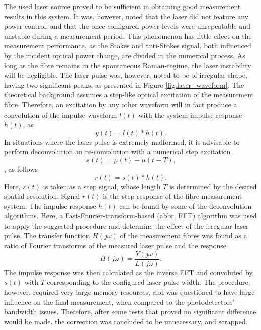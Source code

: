 \documentclass{standalone}
\begin{document}
The used laser source proved to be sufficient in obtaining good measurement results in this system. It was, however, noted that the laser did not feature any power control, and that the once configured power levels were unrepeatable and unstable during a measurement period. This phenomenon has little effect on the measurement performance, as the Stokes and anti-Stokes signal, both influenced by the incident optical power change, are divided in the numerical process. As long as the fibre remains in the spontaneous Raman-regime, the laser instability will be negligible. The laser pulse was, however, noted to be of irregular shape, having two significant peaks, as presented in Figure \ref{fig:laser_waveform}.
The theoretical background assumes a step-like optical excitation of the measurement fibre. Therefore, an excitation by any other waveform will in fact produce a convolution of the impulse waveform $l(t)$ with the system impulse response $h(t)$, as
\begin{equation}
y(t) = l(t) \ast h(t) \textrm{.}
\end{equation}
In situations where the laser pulse is extremely malformed, it is advisable to perform deconvolution an re-convolution with a numerical step excitation
\begin{equation}
s(t) = \mu(t) - \mu(t-T) \textrm{,}
\end{equation}, as follows
\begin{equation}
r(t) = s(t) \ast h(t) \textrm{.}
\end{equation}
Here, $s(t)$ is taken as a step signal, whose length $T$ is determined by the desired spatial resolution. Signal $r(t)$ is the step-response of the fibre measurement system. The impulse response $h(t)$ can be found by some of the deconvolution algorithms. Here, a Fast-Fourier-transform-based (abbr. FFT) algorithm was used to apply the suggested procedure and determine the effect of the irregular laser pulse. The transfer function $H(j\omega)$ of the measurement fibres was found as a ratio of Fourier transforms of the measured laser pulse and the response
\begin{equation}
H(j\omega) = \frac{Y(j\omega)}{L(j\omega)} \textrm{.}
\end{equation}
The impulse response was then calculated as the inverse FFT and convoluted by $s(t)$ with $T$ corresponding to the configured laser pulse width. The procedure, however, required very large memory resources, and was questioned to have large influence on the final measurement, when compared to the photodetectors' bandwidth issues. Therefore, after some tests that proved no significant difference would be made, the correction was concluded to be unnecessary, and scrapped. \\
\end{document}

